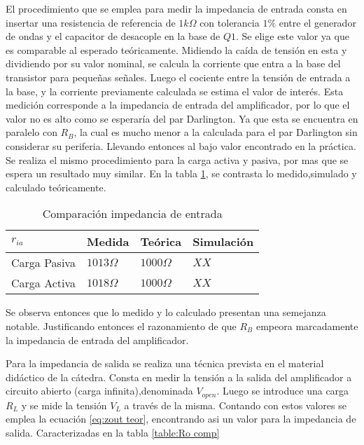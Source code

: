 El procedimiento que se emplea para medir la impedancia de entrada consta en insertar una resistencia de referencia de $1 k\Omega$ con tolerancia $1\%$ entre el generador de ondas y el capacitor de desacople en la base de $Q1$. Se elige este valor ya que es comparable al esperado teóricamente.
Midiendo la caída de tensión en esta y dividiendo por su valor nominal, se calcula la corriente que entra a la base del transistor para pequeñas señales. Luego el cociente entre la tensión de entrada a la base, y la corriente previamente calculada se estima el valor de interés. Esta medición corresponde a la impedancia de entrada del amplificador, por lo que el valor no es alto como se esperaría del par Darlington.
Ya que esta se encuentra en paralelo con $R_B$, la cual es mucho menor a la calculada para el par Darlington sin considerar su periferia. Llevando entonces al bajo valor encontrado en la práctica.
Se realiza el mismo procedimiento para la carga activa y pasiva, por mas que se espera un resultado muy similar. En la tabla \ref{table:Ri comp}, se contrasta lo medido,simulado y calculado teóricamente.

\begin{table}[ht]
    \centering
    \begin{tabular}{|l|l|l|l|}
    \hline
    $r_{ia}$     & Medida       & Teórica         & Simulación \\ \hline
    Carga Pasiva & $1013\Omega$ & $1000\Omega $   &  $XX $          \\ \hline
    Carga Activa & $1018\Omega$ & $1000\Omega $  &  $XX $          \\ \hline
    \end{tabular}
    \caption{Comparación impedancia de entrada}\label{table:Ri comp}
\end{table}

Se observa entonces que lo medido y lo calculado presentan una semejanza notable. Justificando entonces el razonamiento de que $R_B$ empeora marcadamente la impedancia de entrada del amplificador.

Para la impedancia de salida se realiza una técnica prevista en el material didáctico de la cátedra. Consta en medir la tensión a la salida del amplificador a circuito abierto (carga infinita),denominada $V_{open}$. Luego se introduce una carga $R_L$ y se mide la tensión $V_L$ a través de la misma.
Contando con estos valores se emplea la ecuación \ref{eq:zout teor}, encontrando asi un valor para la impedancia de salida. Caracterizadas en la tabla \ref{table:Ro comp}

